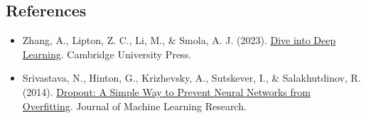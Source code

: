 \FloatBarrier
{}
\hypertarget{references-6}{%
\subsection{References}\label{references-6}}

\vspace{0.25em}
\begin{itemize}
\tightlist
\item
  Zhang, A., Lipton, Z. C., Li, M., \& Smola, A. J. (2023). \href{https://D2L.ai}{Dive into Deep Learning}. Cambridge University Press.
\item
  Srivastava, N., Hinton, G., Krizhevsky, A., Sutskever, I., \& Salakhutdinov, R. (2014). \href{https://jmlr.org/papers/v15/srivastava14a.html}{Dropout: A Simple Way to Prevent Neural Networks from Overfitting}. Journal of Machine Learning Research.
\end{itemize}

\clearpage
